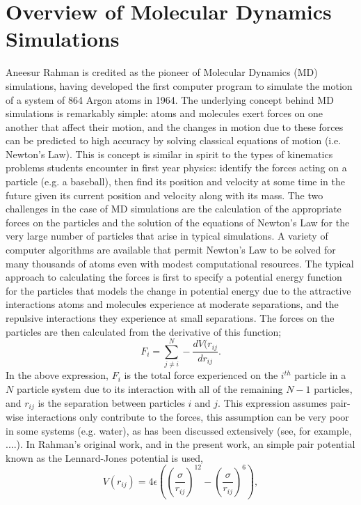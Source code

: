 \documentclass[journal=jpclcd,manuscript=article]{achemso}
\begin{document}
\section{Overview of Molecular Dynamics Simulations}
Aneesur Rahman is credited as the pioneer of Molecular Dynamics (MD) simulations, having developed the first computer
program to simulate the motion of a system of 864 Argon atoms in 1964.%
The underlying concept behind MD simulations is remarkably simple:  atoms and molecules exert forces on one another that affect their motion,
and the changes in motion due to these forces can be predicted to high accuracy by solving classical equations of motion (i.e. Newton's Law).
This is concept is similar in spirit to the types of kinematics problems students encounter in first year physics: identify
the forces acting on a particle (e.g. a baseball), then find its position and velocity at some time in the future given its current
position and velocity along with its mass.  
The two challenges in the case of MD simulations are the calculation of the appropriate forces on the particles and the 
solution of the equations of
Newton's Law for the very large number of particles that arise in typical simulations.  A variety of computer algorithms are
available that permit Newton's Law to be solved for many thousands of atoms even with modest computational resources.
The typical approach to calculating the forces is first to specify a potential energy function for the particles
that models the change in potential energy due to the attractive interactions atoms and molecules experience
at moderate separations, and the repulsive interactions they experience at small separations.  The forces on the particles
are then calculated from the derivative of this function;
\begin{equation}
F_i = \sum_{j \neq i}^N - \frac{d V( r_{ij} }{d r_{ij}}.
\end{equation}
In the above expression, $F_i$ is the total force experienced on the $i^{th}$ particle in a $N$ particle system
due to its interaction with all of the remaining $N-1$ particles, and $r_{ij}$ is the separation between
particles $i$ and $j$.  This expression assumes pair-wise interactions only contribute to the forces, this assumption
can be very poor in some systems (e.g. water), as has been discussed extensively (see, for example, ....).  
In Rahman's original work, and in the present work, an simple pair potential known as the Lennard-Jones potential 
is used,
\begin{equation}
V(r_{ij}) = 4 \epsilon \left( \left( \frac{\sigma}{r_{ij}} \right)^{12} - \left(\frac{\sigma}{r_{ij}} \right)^6 \right),
\end{equation}
\end{document}
